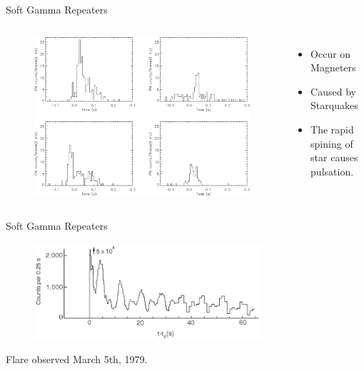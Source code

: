 \documentclass[12pt, aspectratio=169]{beamer}
\begin{document}
\begin{frame}{Soft Gamma Repeaters}
  
\begin{columns}
             \centering
               \begin{figure}
                 \includegraphics[width=\textwidth]{Sgr1806-20.png}
               \end{figure}

             \begin{itemize}
             \item Occur on Magneters
             \item Caused by Starquakes
             \item The rapid spining of star causes pulsation.
             \end{itemize}
            
         \end{columns} 
\end{frame}

\begin{frame}{Soft Gamma Repeaters}
  \centering
  \begin{figure}
    \includegraphics[width=0.75\textwidth]{big_sgr.png}
  \end{figure}
  Flare observed March 5th, 1979.
            
\end{frame}
\end{document}
